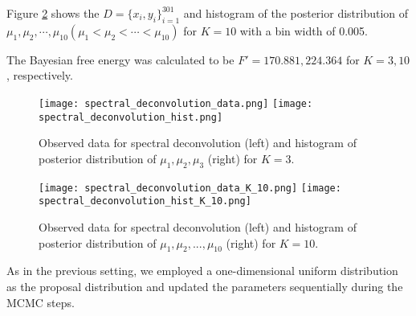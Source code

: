 \documentclass[12pt]{article}
\begin{document}
Figure \ref{fig:spectral_K_10} shows the $D = \{x_i,y_i\}_{i=1}^{301}$ and histogram of the posterior distribution of $\mu_1, \mu_2, \cdots, \mu_{10} (\mu_1< \mu_2< \cdots < \mu_{10})$ for $K = 10$ with a bin width of 0.005. \par
The Bayesian free energy was calculated to be $F' = 170.881, 224.364$ for $K = 3, 10$, respectively. \par
\begin{figure}[h]
  \centering
  \texttt{[image: spectral\_deconvolution\_data.png]}
  \texttt{[image: spectral\_deconvolution\_hist.png]}
  \caption{Observed data for spectral deconvolution (left) and histogram of posterior distribution of $\mu_1, \mu_2, \mu_3$ (right) for $K = 3$.}
  \label{fig:spectral_K_3}
\end{figure}

\begin{figure}[h]
  \centering
  \texttt{[image: spectral\_deconvolution\_data\_K\_10.png]}
  \texttt{[image: spectral\_deconvolution\_hist\_K\_10.png]}
  \caption{Observed data for spectral deconvolution (left) and histogram of posterior distribution of $\mu_1, \mu_2, ..., \mu_{10}$ (right) for $K = 10$.}
  \label{fig:spectral_K_10}
\end{figure}

As in the previous setting, we employed a one-dimensional uniform distribution as the proposal distribution and updated the parameters sequentially during the MCMC steps. \par
\end{document}
